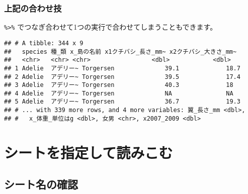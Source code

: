 \documentclass[
  xelatex,ja=standard, b5paper]{bxjsbook}
\newenvironment{Shaded}{\begin{snugshade}}{\end{snugshade}}
\newcommand{\DataTypeTok}[1]{\textcolor[rgb]{0.13,0.29,0.53}{#1}}
\newcommand{\KeywordTok}[1]{\textcolor[rgb]{0.13,0.29,0.53}{\textbf{#1}}}
\newcommand{\NormalTok}[1]{#1}
\newcommand{\OperatorTok}[1]{\textcolor[rgb]{0.81,0.36,0.00}{\textbf{#1}}}
\newcommand{\StringTok}[1]{\textcolor[rgb]{0.31,0.60,0.02}{#1}}
\begin{document}
\hypertarget{ux4e0aux8a18ux306eux5408ux308fux305bux6280}{%
\subsection{上記の合わせ技}\label{ux4e0aux8a18ux306eux5408ux308fux305bux6280}}

\texttt{\%\textgreater{}\%} でつなぎ合わせて1つの実行で合わせてしまうこともできます。

\begin{Shaded}
\end{Shaded}

\begin{verbatim}
## # A tibble: 344 x 9
##   species 種_類 x_島の名前 x1クチバシ_長さ_mm~ x2クチバシ_大きさ_mm~
##   <chr>   <chr> <chr>                 <dbl>            <dbl>
## 1 Adelie  アデリー~ Torgersen              39.1             18.7
## 2 Adelie  アデリー~ Torgersen              39.5             17.4
## 3 Adelie  アデリー~ Torgersen              40.3             18  
## 4 Adelie  アデリー~ Torgersen              NA               NA  
## 5 Adelie  アデリー~ Torgersen              36.7             19.3
## # ... with 339 more rows, and 4 more variables: 翼_長さ_mm <dbl>,
## #   x_体重_単位はg <dbl>, 女男 <chr>, x2007_2009 <dbl>
\end{verbatim}

\hypertarget{ux30b7ux30fcux30c8ux3092ux6307ux5b9aux3057ux3066ux8aadux307fux3053ux3080}{%
\chapter{シートを指定して読みこむ}\label{ux30b7ux30fcux30c8ux3092ux6307ux5b9aux3057ux3066ux8aadux307fux3053ux3080}}

\hypertarget{ux30b7ux30fcux30c8ux540dux306eux78baux8a8d}{%
\section{シート名の確認}\label{ux30b7ux30fcux30c8ux540dux306eux78baux8a8d}}
\end{document}

